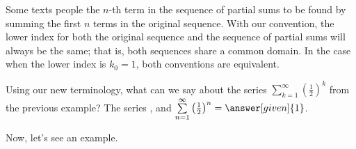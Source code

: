 \documentclass{ximera}
\begin{document}
\begin{remark}
Some texts people the $n$-th term in the sequence of partial sums to be found by summing the first $n$ terms in the original sequence.  With our convention, the lower index for both the original sequence and the sequence of partial sums will always be the same; that is, both sequences share a common domain.  In the case when the lower index is $k_0=1$, both conventions are equivalent.
\end{remark}









\begin{question}
  Using our new terminology, what can we say about the series $\sum\limits_{k=1}^\infty \left(\frac{1}{2}\right)^k$ from the previous example?  The series     , and
      $\sum\limits_{n=1}^\infty \left(\frac{1}{2}\right)^n = \answer[given]{1}$.
  \end{question}








Now, let's see an example.
\end{document}
